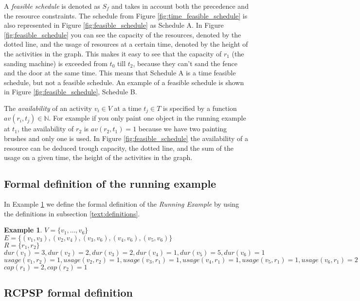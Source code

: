 \documentclass{article}
\theoremstyle{definition}
\newtheorem{example}{Example}[section]
\newcommand{\av}[2]{\ensuremath{av(r_{#1}, t_{#2})}} %
\newcommand{\capa}[1]{\ensuremath{cap(r_{#1})}} %
\newcommand{\dur}[1]{\ensuremath{dur(v_{#1})}} %
\newcommand{\usage}[2]{\ensuremath{usage(v_{#1}, r_{#2})}} %
\begin{document}
A \emph{feasible schedule} is denoted as $S_f$ and takes in account both the precedence and the resource constraints.
The schedule from Figure \ref{fig:time_feasible_schedule} is also represented in Figure \ref{fig:feasible_schedule} as Schedule A.
In Figure \ref{fig:feasible_schedule} you can see the capacity of the resources, denoted by the dotted line, and the usage of resources at a certain time, denoted by the height of the activities in the graph.
This makes it easy to see that the capacity of $r_1$ (the sanding machine) is exceeded from $t_0$ till $t_2$, because they can't sand the fence and the door at the same time.
This means that Schedule A is a time feasible schedule, but not a feasible schedule.
An example of a feasible schedule is shown in Figure \ref{fig:feasible_schedule}, Schedule B.

The \emph{availability} of an activity $v_i \in V$ at a time $t_j \in T$ is specified by a function $\av{i}{j} \in \mathbb{N}$.
For example if you only paint one object in the running example at $t_1$, the availability of $r_2$ is $\av{2}{1} = 1$ because we have two painting brushes and only one is used.
In Figure \ref{fig:feasible_schedule} the availability of a resource can be deduced trough capacity, the dotted line, and the sum of the usage on a given time, the height of the activities in the graph. 

\subsection{Formal definition of the running example}
\label{text:running_example_definition}

In Example \ref{exmp:running} we define the formal definition of the \emph{Running Example} by using the definitions in subsection \ref{text:definitions}.
\begin{example}
\label{exmp:running}
$V = \{v_1, \ldots, v_6\}$\\
$E = \{(v_1, v_3), (v_2, v_4), (v_3, v_6), (v_4, v_6), (v_5, v_6)\}$\\
$R = \{r_1, r_2\}$\\
$\dur{1} = 3, \dur{2} = 2, \dur{3} = 2, \dur{4} = 1, \dur{5} = 5, \dur{6} = 1$\\
$\usage{1}{2} = 1, \usage{2}{2} = 1, \usage{3}{1} = 1, \usage{4}{1} = 1, \usage{5}{1} = 1, \usage{6}{1} = 2$\\
$\capa{1} = 2, \capa{2} = 1$
\end{example}


\subsection{RCPSP formal definition}
\label{text:RCPSP_definition}
\end{document}
